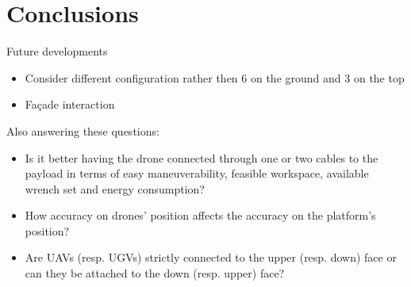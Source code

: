 \chapter{Conclusions}
Future developments
\begin{itemize}
    \item Consider different configuration rather then 6 on the ground and 3 on the top
    \item Façade interaction
\end{itemize}

\noindent Also answering these questions:
\begin{itemize}
    \item Is it better having the drone connected through one or two cables to the payload in terms of easy maneuverability, feasible workspace, available wrench set and energy consumption?
    \item How accuracy on drones' position affects the accuracy on the platform's position?
    \item Are UAVs (resp. UGVs) strictly connected to the upper (resp. down) face or can they be attached to the down (resp. upper) face?
\end{itemize}